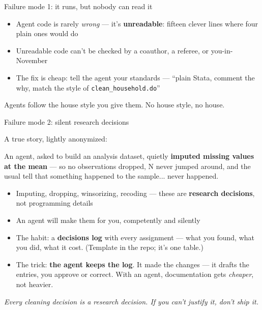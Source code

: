 \documentclass[aspectratio=169, 10pt]{beamer}
\begin{document}
\begin{frame}{Failure mode 1: it runs, but nobody can read it}

\begin{itemize}
  \item Agent code is rarely \emph{wrong} --- it's \textbf{unreadable}: fifteen clever lines where four plain ones would do
  \item Unreadable code can't be checked by a coauthor, a referee, or you-in-November
  \item The fix is cheap: tell the agent your standards --- ``plain Stata, comment the why, match the style of \texttt{clean\_household.do}''
\end{itemize}

\vspace{0.4cm}

\begin{tcolorbox}[accentbox]
\centering
Agents follow the house style you give them. No house style, no house.
\end{tcolorbox}

\end{frame}

\begin{frame}{Failure mode 2: silent research decisions}

A true story, lightly anonymized:

\begin{tcolorbox}[quotebox]
An agent, asked to build an analysis dataset, quietly \textbf{imputed missing values at the mean} --- so no observations dropped, N never jumped around, and the usual tell that something happened to the sample... never happened.
\end{tcolorbox}

\vspace{0.3cm}

\begin{itemize}
  \item Imputing, dropping, winsorizing, recoding --- these are \textbf{research decisions}, not programming details
  \item An agent will make them for you, competently and silently
  \item The habit: a \textbf{decisions log} with every assignment --- what you found, what you did, what it cost. (Template in the repo; it's one table.)
  \item The trick: \textbf{the agent keeps the log}. It made the changes --- it drafts the entries, you approve or correct. With an agent, documentation gets \emph{cheaper}, not heavier.
\end{itemize}

\vspace{0.2cm}

\begin{center}
\small\color{CoolGray}\textit{Every cleaning decision is a research decision. If you can't justify it, don't ship it.}
\end{center}

\end{frame}
\end{document}
